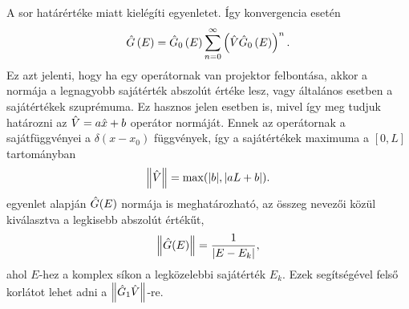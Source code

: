 A sor határértéke  miatt kielégíti  egyenletet. Így konvergencia esetén
\begin{equation}
	\hat{G}\left(E\right) = \hat{G}_0\left(E\right)\sum_{n=0}^\infty\left(\hat{V}\hat{G}_0\left(E\right)\right)^n.
	\label{perturbation:series}
\end{equation}
Ez azt jelenti, hogy ha egy operátornak van projektor felbontása, akkor a normája a legnagyobb sajátérték abszolút értéke lesz, vagy általános esetben a sajátértékek szuprémuma. Ez hasznos jelen esetben is, mivel így meg tudjuk határozni az $\hat{V}=a\hat{x}+b$ operátor normáját. Ennek az operátornak a sajátfüggvényei a $\delta(x-x_0)$ függvények, így a sajátértékek maximuma a $[0,L]$ tartományban
\begin{equation}
	\left\lVert \hat{V} \right\rVert=\max(\rvert b \lvert, \lvert aL+b\rvert).
\end{equation}
 egyenlet alapján $\hat{G}(E)$ normája is meghatározható, az összeg nevezői közül kiválasztva a legkisebb abszolút értékűt,
\begin{equation}
	\left\lVert \hat{G}(E) \right\rVert=\frac{1}{\lvert E-E_k\rvert},
\end{equation}
ahol $E$-hez a komplex síkon a legközelebbi sajátérték $E_k$. Ezek segítségével felső korlátot lehet adni a $\left\lVert \hat{G}_1\hat{V} \right\rVert$-re.

